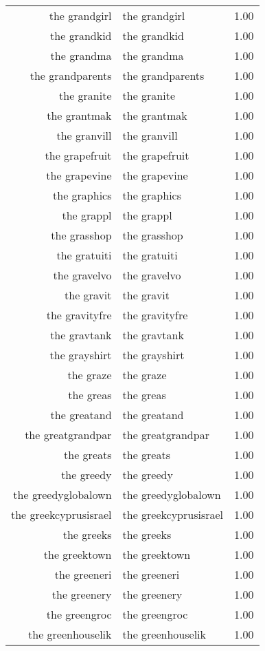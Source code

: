 \begin{table}[ht]
\begin{tabular}{rlr}
  the grandgirl & the grandgirl & 1.00 \\ 
  the grandkid & the grandkid & 1.00 \\ 
  the grandma & the grandma & 1.00 \\ 
  the grandparents & the grandparents & 1.00 \\ 
  the granite & the granite & 1.00 \\ 
  the grantmak & the grantmak & 1.00 \\ 
  the granvill & the granvill & 1.00 \\ 
  the grapefruit & the grapefruit & 1.00 \\ 
  the grapevine & the grapevine & 1.00 \\ 
  the graphics & the graphics & 1.00 \\ 
  the grappl & the grappl & 1.00 \\ 
  the grasshop & the grasshop & 1.00 \\ 
  the gratuiti & the gratuiti & 1.00 \\ 
  the gravelvo & the gravelvo & 1.00 \\ 
  the gravit & the gravit & 1.00 \\ 
  the gravityfre & the gravityfre & 1.00 \\ 
  the gravtank & the gravtank & 1.00 \\ 
  the grayshirt & the grayshirt & 1.00 \\ 
  the graze & the graze & 1.00 \\ 
  the greas & the greas & 1.00 \\ 
  the greatand & the greatand & 1.00 \\ 
  the greatgrandpar & the greatgrandpar & 1.00 \\ 
  the greats & the greats & 1.00 \\ 
  the greedy & the greedy & 1.00 \\ 
  the greedyglobalown & the greedyglobalown & 1.00 \\ 
  the greekcyprusisrael & the greekcyprusisrael & 1.00 \\ 
  the greeks & the greeks & 1.00 \\ 
  the greektown & the greektown & 1.00 \\ 
  the greeneri & the greeneri & 1.00 \\ 
  the greenery & the greenery & 1.00 \\ 
  the greengroc & the greengroc & 1.00 \\ 
  the greenhouselik & the greenhouselik & 1.00 \\ 

\end{tabular}
\end{table}
